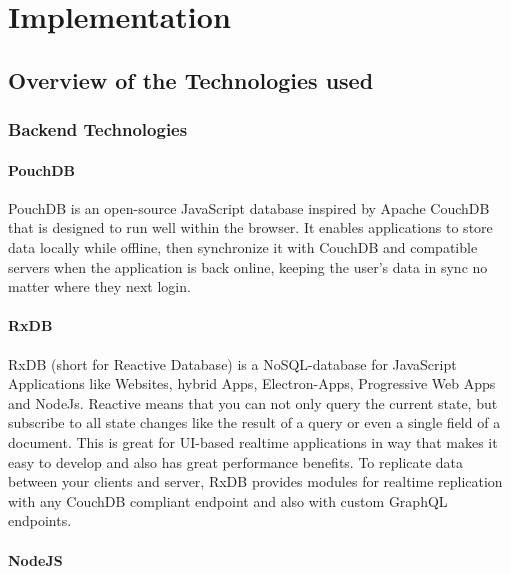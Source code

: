 \chapter{Implementation}




\section{Overview of the Technologies used}

\subsection{Backend Technologies}

    \subsubsection{PouchDB}
PouchDB is an open-source JavaScript database inspired by Apache CouchDB 
that is designed to run well within the browser.
It enables applications to store data locally while offline, 
then synchronize it with CouchDB and compatible servers when the application is back online, keeping the user's data in sync 
no matter where they next login.

    \subsubsection{RxDB}
RxDB (short for Reactive Database) is a NoSQL-database for JavaScript Applications like Websites, 
hybrid Apps, Electron-Apps, Progressive Web Apps and NodeJs. Reactive means that you can not only 
query the current state, but subscribe to all state changes like the result of a query or even a 
single field of a document. This is great for UI-based realtime applications in way that makes it 
easy to develop and also has great performance benefits. To replicate data between your clients and server,
 RxDB provides modules for realtime replication with any CouchDB compliant endpoint and also with custom GraphQL endpoints. 

    \subsubsection{NodeJS}
    